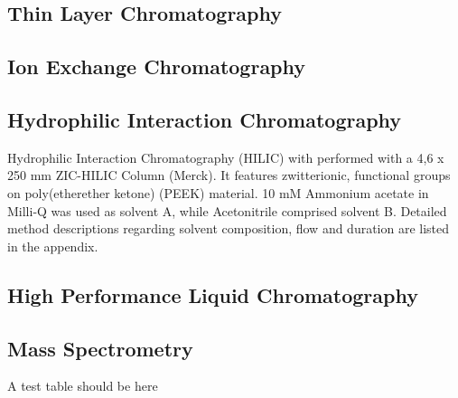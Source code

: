 	\subsection{Thin Layer Chromatography} %
	\label{sub:thin_layer_chromatography}

	\subsection{Ion Exchange Chromatography} %
	\label{sub:ion_exchange_chromatography}

	\subsection{Hydrophilic Interaction Chromatography} %
	\label{sub:hilic}

	Hydrophilic Interaction Chromatography (HILIC) with performed with a 4,6 x 250 mm ZIC-HILIC Column (Merck). It features zwitterionic, functional groups on poly(etherether ketone) (PEEK) material.
	10 mM Ammonium acetate in Milli-Q  was used as solvent A, while Acetonitrile comprised solvent B. Detailed method descriptions regarding solvent composition, flow and duration are listed in the appendix.

	\subsection{High Performance Liquid Chromatography} %
	\label{sub:hplc}

	\subsection{Mass Spectrometry} %
	\label{sub:mass_spectrometry}

A test table should be here

